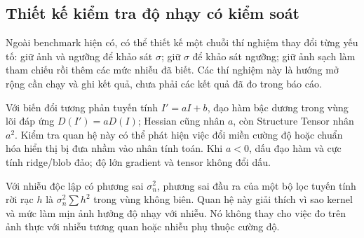 \subsection{Thiết kế kiểm tra độ nhạy có kiểm soát}
Ngoài benchmark hiện có, có thể thiết kế một chuỗi thí nghiệm thay đổi từng yếu tố: giữ ảnh và ngưỡng để khảo sát $\sigma$; giữ $\sigma$ để khảo sát ngưỡng; giữ ảnh sạch làm tham chiếu rồi thêm các mức nhiễu đã biết. Các thí nghiệm này là hướng mở rộng cần chạy và ghi kết quả, chưa phải các kết quả đã đo trong báo cáo.

Với biến đổi tương phản tuyến tính $I'=aI+b$, đạo hàm bậc dương trong vùng lõi đáp ứng $D(I')=aD(I)$; Hessian cũng nhân $a$, còn Structure Tensor nhân $a^2$. Kiểm tra quan hệ này có thể phát hiện việc đổi miền cường độ hoặc chuẩn hóa hiển thị bị đưa nhầm vào nhân tính toán. Khi $a<0$, dấu đạo hàm và cực tính ridge/blob đảo; độ lớn gradient và tensor không đổi dấu.

Với nhiễu độc lập có phương sai $\sigma_n^2$, phương sai đầu ra của một bộ lọc tuyến tính rời rạc $h$ là $\sigma_n^2\sum h^2$ trong vùng không biên. Quan hệ này giải thích vì sao kernel và mức làm mịn ảnh hưởng độ nhạy với nhiễu. Nó không thay cho việc đo trên ảnh thực với nhiễu tương quan hoặc nhiễu phụ thuộc cường độ.
